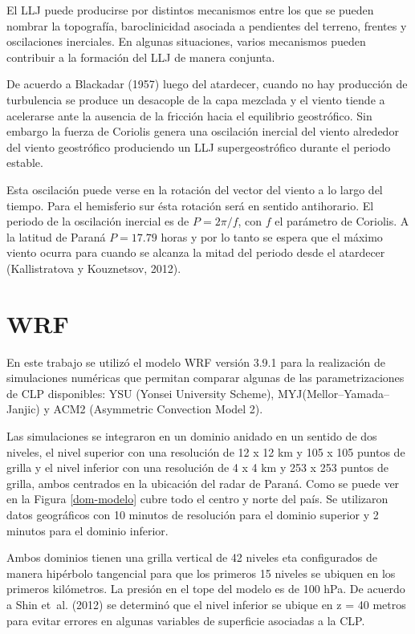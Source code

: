 \documentclass[12pt,spanish,oneside]{book}
\begin{document}
El LLJ puede producirse por distintos mecanismos entre los que se pueden
nombrar la topografía, baroclinicidad asociada a pendientes del terreno,
frentes y oscilaciones inerciales. En algunas situaciones, varios
mecanismos pueden contribuir a la formación del LLJ de manera conjunta.

De acuerdo a Blackadar (1957) luego del atardecer, cuando no hay
producción de turbulencia se produce un desacople de la capa mezclada y
el viento tiende a acelerarse ante la ausencia de la fricción hacia el
equilibrio geostrófico. Sin embargo la fuerza de Coriolis genera una
oscilación inercial del viento alrededor del viento geostrófico
produciendo un LLJ supergeostrófico durante el periodo estable.

Esta oscilación puede verse en la rotación del vector del viento a lo
largo del tiempo. Para el hemisferio sur ésta rotación será en sentido
antihorario. El periodo de la oscilación inercial es de \(P = 2\pi/f\),
con \(f\) el parámetro de Coriolis. A la latitud de Paraná \(P = 17.79\)
horas y por lo tanto se espera que el máximo viento ocurra para cuando
se alcanza la mitad del periodo desde el atardecer (Kallistratova y
Kouznetsov, 2012).

\section{WRF}\label{wrf}

En este trabajo se utilizó el modelo WRF versión 3.9.1 para la
realización de simulaciones numéricas que permitan comparar algunas de
las parametrizaciones de CLP disponibles: YSU (Yonsei University
Scheme), MYJ(Mellor--Yamada--Janjic) y ACM2 (Asymmetric Convection Model
2).

Las simulaciones se integraron en un dominio anidado en un sentido de
dos niveles, el nivel superior con una resolución de 12 x 12 km y 105 x
105 puntos de grilla y el nivel inferior con una resolución de 4 x 4 km
y 253 x 253 puntos de grilla, ambos centrados en la ubicación del radar
de Paraná. Como se puede ver en la Figura \ref{dom-modelo} cubre todo el
centro y norte del país. Se utilizaron datos geográficos con 10 minutos
de resolución para el dominio superior y 2 minutos para el dominio
inferior.

Ambos dominios tienen una grilla vertical de 42 niveles eta configurados
de manera hipérbolo tangencial para que los primeros 15 niveles se
ubiquen en los primeros kilómetros. La presión en el tope del modelo es
de 100 hPa. De acuerdo a Shin et~al. (2012) se determinó que el nivel
inferior se ubique en z = 40 metros para evitar errores en algunas
variables de superficie asociadas a la CLP.
\end{document}
